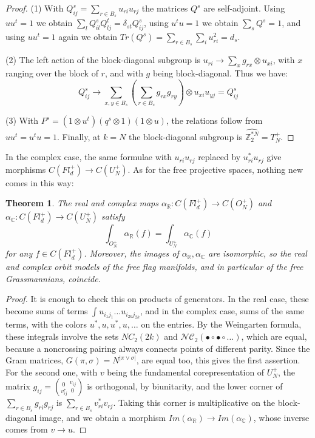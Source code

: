 \documentclass[11pt]{article}
\theoremstyle{plain}
\newtheorem{theorem}{Theorem}[section]
\begin{document}
\begin{proof}
(1) With $Q^s_{ij}=\sum_{r\in B_s}u_{ri}u_{rj}$ the matrices $Q^s$ are self-adjoint. Using $uu^t=1$ we obtain $\sum_lQ^s_{il}Q^t_{lj}=\delta_{st}Q^s_{ij}$, using $u^tu=1$ we obtain $\sum_sQ^s=1$, and using $uu^t=1$ again we obtain $Tr(Q^s)=\sum_{r\in B_s}\sum_iu_{ri}^2=d_s$.

(2) The left action of the block-diagonal subgroup is $u_{ri}\to\sum_xg_{rx}\otimes u_{xi}$, with $x$ ranging over the block of $r$, and with $g$ being block-diagonal. Thus we have:
$$Q^s_{ij}\to\sum_{x,y\in B_s}\left(\sum_{r\in B_s}g_{rx}g_{ry}\right)\otimes u_{xi}u_{yj}=Q^s_{ij}$$

(3) With $P^s=(1\otimes u^t)(q^s\otimes1)(1\otimes u)$, the relations follow from $uu^t=u^tu=1$. Finally, at $k=N$ the block-diagonal subgroup is $\widehat{\mathbb Z_2^{*N}}=T_N^+$.
\end{proof}

In the complex case, the same formulae with $u_{ri}u_{rj}$ replaced by $u_{ri}^*u_{rj}$ give morphisms $C(Fl^+_d)\to C(U_N^+)$. As for the free projective spaces, nothing new comes in this way:

\begin{theorem}
\label{thm:realcomplex}
The real and complex maps $\alpha_\mathbb R:C(Fl^+_d)\to C(O_N^+)$ and $\alpha_\mathbb C:C(Fl^+_d)\to C(U_N^+)$ satisfy
$$\int_{O_N^+}\alpha_\mathbb R(f)=\int_{U_N^+}\alpha_\mathbb C(f)$$
for any $f\in C(Fl^+_d)$. Moreover, the images of $\alpha_\mathbb R,\alpha_\mathbb C$ are isomorphic, so the real and complex orbit models of the free flag manifolds, and in particular of the free Grassmannians, coincide.
\end{theorem}

\begin{proof}
It is enough to check this on products of generators. In the real case, these become sums of terms $\int u_{i_1j_1}\ldots u_{i_{2k}j_{2k}}$, and in the complex case, sums of the same terms, with the colors $u^*,u,u^*,u,\ldots$ on the entries. By the Weingarten formula, these integrals involve the sets $NC_2(2k)$ and $\mathcal{NC}_2(\bullet\circ\bullet\circ\ldots)$, which are equal, because a noncrossing pairing always connects points of different parity. Since the Gram matrices, $G(\pi,\sigma)=N^{|\pi\vee\sigma|}$, are equal too, this gives the first assertion. For the second one, with $v$ being the fundamental corepresentation of $U_N^+$, the matrix $g_{ij}=(^{\ 0\ }_{v_{ij}^*}{\ }^{v_{ij}}_{\ 0\ })$ is orthogonal, by biunitarity, and the lower corner of $\sum_{r\in B_s}g_{ri}g_{rj}$ is $\sum_{r\in B_s}v_{ri}^*v_{rj}$. Taking this corner is multiplicative on the block-diagonal image, and we obtain a morphism $Im(\alpha_\mathbb R)\to Im(\alpha_\mathbb C)$, whose inverse comes from $v\to u$.
\end{proof}
\end{document}
